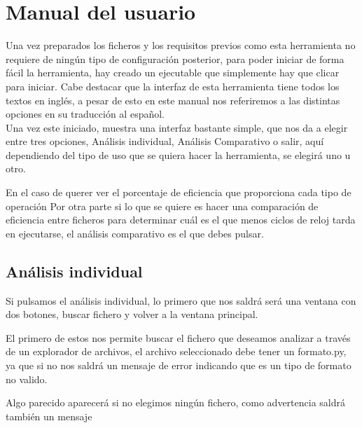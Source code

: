 \section{Manual del usuario}

Una vez preparados los ficheros y los requisitos previos como esta herramienta no requiere de ningún tipo de configuración posterior, para poder iniciar de forma fácil la herramienta, hay creado un ejecutable que simplemente hay que clicar para iniciar. Cabe destacar que la interfaz de esta herramienta tiene todos los textos en inglés, a pesar de esto en este manual nos referiremos a las distintas opciones en su traducción al español.\\

Una vez este iniciado, muestra una interfaz bastante simple, que nos da a elegir entre tres opciones, Análisis individual, Análisis Comparativo o salir, aquí dependiendo del tipo de uso que se quiera hacer la herramienta, se elegirá uno u otro.\\


En el caso de querer ver el porcentaje de eficiencia que proporciona cada tipo de operación
Por otra parte si lo que se quiere es hacer una comparación de eficiencia entre ficheros para determinar cuál es el que menos ciclos de reloj tarda en ejecutarse, el análisis comparativo es el que debes pulsar.


\subsection{Análisis individual}

Si pulsamos el análisis individual, lo primero que nos saldrá será una ventana con dos botones, buscar fichero y volver a la ventana principal.\\


El primero de estos nos permite buscar el fichero que deseamos analizar a través de un explorador de archivos, el archivo seleccionado debe tener un formato.py, ya que si no nos saldrá un mensaje de error indicando que es un tipo de formato no valido.\\


Algo parecido aparecerá si no elegimos ningún fichero, como advertencia saldrá  también un mensaje\\

